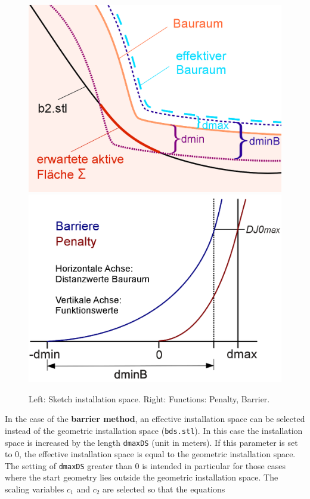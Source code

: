\documentclass[oneside]{article}
\numberwithin{equation}{section}
\numberwithin{figure}{section}
\numberwithin{figure}{section}
\begin{document}
\begin{figure}[htbp]
    \centering
    \includegraphics[scale=0.45]{bauraum_parameter1deutsch.png} \quad
    \includegraphics[scale=0.45]{bauraum_parameter2.png} 
    \caption{Left: Sketch installation space. Right: Functions: Penalty, Barrier.} 
    \label{fig:bauraum_parameter}
\end{figure}
In the case of the \textbf{barrier method}, an effective installation space can be selected instead of the geometric installation space (\texttt{bds.stl}). In this case the installation space is increased by the length \texttt{dmaxDS} (unit in meters). If this parameter is set to 0, the effective installation space is equal to the geometric installation space. The setting of \texttt{dmaxDS} greater than 0 is intended in particular for those cases where the start geometry lies outside the geometric installation space. The scaling variables $c_1$ and $c_2$ are selected so that the equations 
\end{document}
